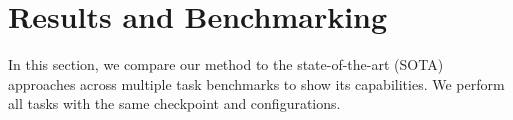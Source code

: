 \documentclass[letterpaper, 10 pt, conference]{ieeeconf}  %
\begin{document}
\vspace{0mm}
\section{Results and Benchmarking}
\vspace{-1mm}
In this section, we compare our method to the state-of-the-art (SOTA) approaches across multiple task benchmarks to show its capabilities. We perform all tasks with the same checkpoint and configurations.


\end{document}
